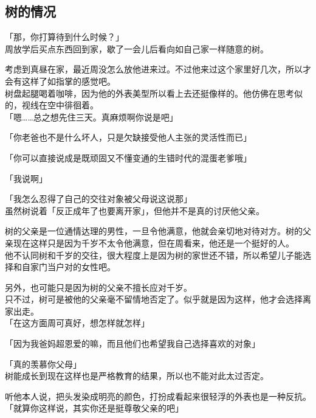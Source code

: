 \subsection{树的情况}

「那，你打算待到什么时候？」\\

周放学后买点东西回到家，歇了一会儿后看向如自己家一样随意的树。

考虑到真昼在家，最近周没怎么放他进来过。不过他来过这个家里好几次，所以才会有这样了如指掌的感觉吧。\\

树盘起腿喝着咖啡，因为他的外表美型所以看上去还挺像样的。他仿佛在思考似的，视线在空中徘徊着。\\

「嗯……总之想先住三天。真麻烦啊你说是吧」

「你老爸也不是什么坏人，只是欠缺接受他人主张的灵活性而已」

「你可以直接说成是既顽固又不懂变通的生错时代的混蛋老爹哦」

「我说啊」

「我怎么忍得了自己的交往对象被父母说这说那」\\

虽然树说着「反正成年了也要离开家」，但他并不是真的讨厌他父亲。

树的父亲是一位通情达理的男性，一旦令他满意，他就会亲切地对待对方。树的父亲现在这样只是因为千岁不太令他满意，但在周看来，他还是一个挺好的人。\\

他不认同树和千岁的交往，很大程度上是因为树的家世还不错，所以希望儿子能选择和自家门当户对的女性吧。

另外，也可能只是因为树的父亲不擅长应对千岁。\\

只不过，树可是被他的父亲毫不留情地否定了。似乎就是因为这样，他才会选择离家出走。\\

「在这方面周可真好，想怎样就怎样」

「因为我爸妈超恩爱的嘛，而且他们也希望我自己选择喜欢的对象」

「真的羡慕你父母」\\

树能成长到现在这样也是严格教育的结果，所以也不能对此太过否定。

听他本人说，把头发染成明亮的颜色，打扮成看起来很轻浮的外表也是一种反抗。\\

「就算你这样说，其实你还是挺尊敬父亲的吧」

